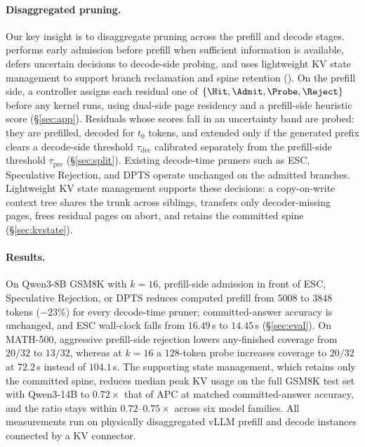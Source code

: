\paragraph{Disaggregated pruning.}
Our key insight is to disaggregate pruning across the prefill and decode stages.
\sys performs early admission before prefill when sufficient information is available, defers uncertain decisions to decode-side probing, and uses lightweight KV state management to support branch reclamation and spine retention ().
On the prefill side, a controller assigns each residual one of $\{\Hit,\Admit,\Probe,\Reject\}$ before any kernel runs, using dual-side page residency and a prefill-side heuristic score (\S\ref{sec:app}).
Residuals whose scores fall in an uncertainty band are probed: they are prefilled, decoded for $t_0$ tokens, and extended only if the generated prefix clears a decode-side threshold $\tau_{\mathrm{dec}}$ calibrated separately from the prefill-side threshold $\tau_{\mathrm{pre}}$ (\S\ref{sec:split}).
Existing decode-time pruners such as ESC, Speculative Rejection, and DPTS operate unchanged on the admitted branches.
Lightweight KV state management supports these decisions: a copy-on-write context tree shares the trunk across siblings, transfers only decoder-missing pages, frees residual pages on abort, and retains the committed spine (\S\ref{sec:kvstate}).

\paragraph{Results.}
On Qwen3-8B GSM8K with $k{=}16$, prefill-side admission in front of ESC, Speculative Rejection, or DPTS reduces computed prefill from $5008$ to $3848$ tokens ($-23\%$) for every decode-time pruner; committed-answer accuracy is unchanged, and ESC wall-clock falls from $16.49$\,s to $14.45$\,s (\S\ref{sec:eval}).
On MATH-500, aggressive prefill-side rejection lowers any-finished coverage from $20/32$ to $13/32$, whereas at $k{=}16$ a $128$-token probe increases coverage to $20/32$ at $72.2$\,s instead of $104.1$\,s.
The supporting state management, which retains only the committed spine, reduces median peak KV usage on the full GSM8K test set with Qwen3-14B to $0.72\times$ that of APC at matched committed-answer accuracy, and the ratio stays within $0.72$--$0.75\times$ across six model families.
All measurements run on physically disaggregated vLLM prefill and decode instances connected by a KV connector.

